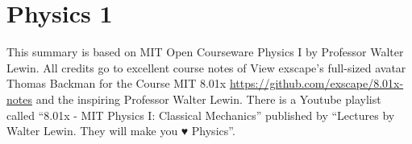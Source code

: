 \newcommand{\pIImages}{\pathPI/images}
\newcommand{\overbar}[1]{\mkern 1.5mu\overline{\mkern-1.5mu#1\mkern-1.5mu}\mkern 1.5mu}

\chapter{Physics 1}
This summary is based on MIT Open Courseware Physics I by Professor Walter Lewin.
All credits go to excellent course notes of 
View exscape's full-sized avatar Thomas Backman for the Course MIT 8.01x \url{https://github.com/exscape/8.01x-notes} and the inspiring Professor Walter Lewin. There is a Youtube playlist called ``8.01x - MIT Physics I: Classical Mechanics'' published by ``Lectures by Walter Lewin. They will make you ♥ Physics''.














